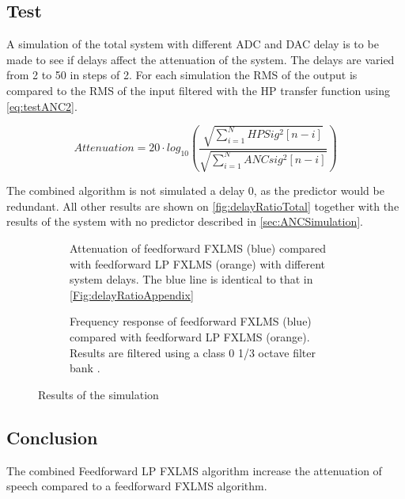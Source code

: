\subsection{Test}
A simulation of the total system with different ADC and DAC delay is to be made to see if delays affect the attenuation of the system. The delays are varied from 2 to 50 in steps of 2. For each simulation the RMS of the output is compared to the RMS of the input filtered with the HP transfer function using \autoref{eq:testANC2}. 

\begin{equation}\label{eq:testANC2}
	Attenuation=20 \cdot log_{10} \left (\frac{\sqrt{\sum\limits_{i=1}^{N}HPSig^2[n-i]}}{\sqrt{\sum\limits_{i=1}^{N}ANCsig^2[n-i]}}  \right )
\end{equation}

The combined algorithm is not simulated a delay 0, as the predictor would be redundant. All other results are shown on \autoref{fig:delayRatioTotal} together with the results of the system with no predictor described in \autoref{sec:ANCSimulation}.
\begin{figure}[H]
	\centering
		\hspace{-20mm}
	\begin{subfigure}[b]{0.40\textwidth}
	\centering
		
		\caption{ Attenuation of feedforward FXLMS (blue) compared with feedforward LP FXLMS (orange) with different system delays. The blue line is identical to that in \autoref{Fig:delayRatioAppendix}}
		\label{fig:delayRatioTotal}
	\end{subfigure}
	\hspace{20mm}
	\begin{subfigure}[b]{0.40\textwidth}
	\centering
	
	\caption{Frequency response of feedforward FXLMS (blue) compared with feedforward LP FXLMS (orange). Results are filtered using a class 0 1/3 octave filter bank \cite{OctaveBand}.}
	\label{fig:ANCcompareALLAppendix}
	\end{subfigure}	
	\caption{Results of the simulation}	
\end{figure}



\subsection{Conclusion}
The combined Feedforward LP FXLMS algorithm increase the attenuation of speech compared to a feedforward FXLMS algorithm. 
